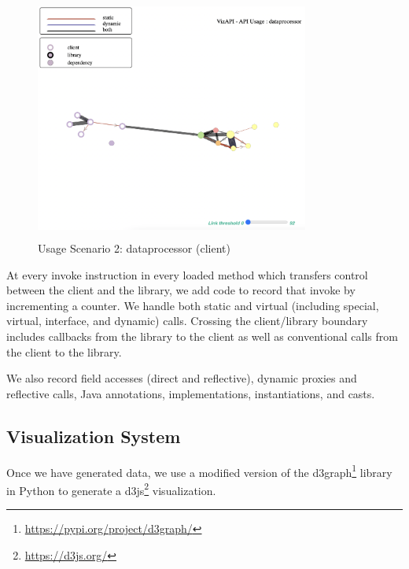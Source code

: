 \begin{figure}[t]
\begin{center}
\includegraphics[scale=1,width=9cm,height=8cm]{images/usage-scenario2.png}
\caption{Usage Scenario 2: dataprocessor (client)}
\label{fig:usagescenario2}
\end{center}
\end{figure}

At every invoke instruction in every
loaded method which transfers control between the client and the
library, we add code to record that invoke by incrementing a counter.
We handle both static and virtual (including special, virtual,
interface, and dynamic) calls. Crossing the client/library boundary
includes callbacks from the library to the client as well as conventional
calls from the client to the library. 

We also record field accesses (direct and reflective), dynamic proxies
and reflective calls, Java annotations, implementations,
instantiations, and casts.

\subsection{Visualization System}
\label{subsec:vis-system}

Once we have generated data, we use a modified version
of the d3graph\footnote{\url{https://pypi.org/project/d3graph/}} library in Python to generate a d3js\footnote{\url{https://d3js.org/}}
visualization. 

